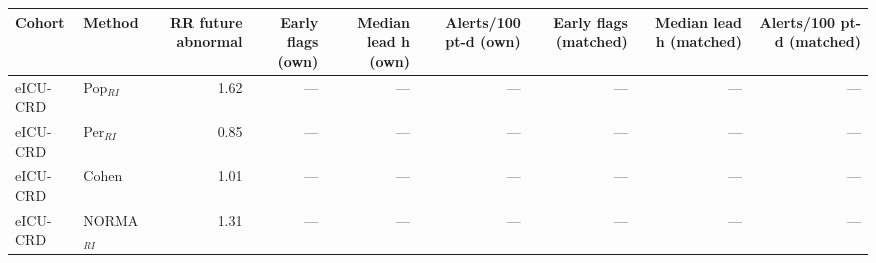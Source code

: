 \begin{table}[ht]
\centering
\scriptsize
\begin{tabular}{llrrrrrrr}
\toprule
Cohort & Method & RR future abnormal & Early flags (own) & Median lead h (own) & Alerts/100 pt-d (own) & Early flags (matched) & Median lead h (matched) & Alerts/100 pt-d (matched) \\
\midrule
eICU-CRD & Pop$_{RI}$ & 1.62 & --- & --- & --- & --- & --- & --- \\
eICU-CRD & Per$_{RI}$ & 0.85 & --- & --- & --- & --- & --- & --- \\
eICU-CRD & Cohen & 1.01 & --- & --- & --- & --- & --- & --- \\
eICU-CRD & NORMA$_{RI}$ & 1.31 & --- & --- & --- & --- & --- & --- \\
\bottomrule
\end{tabular}
\label{tab:11_lead_time}
\end{table}
